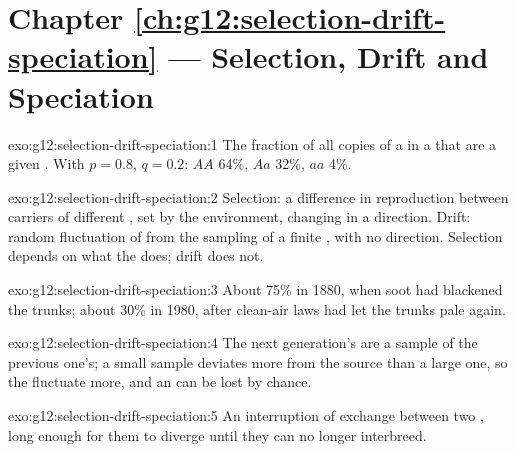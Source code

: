 \section*{Chapter \ref{ch:g12:selection-drift-speciation} --- Selection, Drift and Speciation}

\begin{solution}{exo:g12:selection-drift-speciation:1}
The fraction of all copies of a  in a  that are a given
. With $p = 0.8$, $q = 0.2$: $AA$ 64\%, $Aa$ 32\%, $aa$ 4\%.
\end{solution}

\begin{solution}{exo:g12:selection-drift-speciation:2}
Selection: a difference in reproduction between carriers of different
, set by the environment, changing  in a direction.
Drift: random fluctuation of  from the sampling of a finite
, with no direction. Selection depends on what the 
does; drift does not.
\end{solution}

\begin{solution}{exo:g12:selection-drift-speciation:3}
About 75\% in 1880, when soot had blackened the trunks; about 30\% in
1980, after clean-air laws had let the trunks pale again.
\end{solution}

\begin{solution}{exo:g12:selection-drift-speciation:4}
The next generation's  are a sample of the previous one's; a
small sample deviates more from the source than a large one, so the
 fluctuate more, and an  can be lost by chance.
\end{solution}

\begin{solution}{exo:g12:selection-drift-speciation:5}
An interruption of  exchange between two , long enough
for them to diverge until they can no longer interbreed.
\end{solution}

